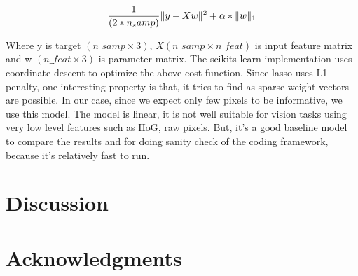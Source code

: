 \documentclass[10pt]{article}
\begin{document}
$${1 \over (2*n_samp)} \| y -Xw \|^2 + \alpha * \| w \|_1$$

Where y is target $(n\_samp \times 3)$, $X (n\_samp \times n\_feat)$ is input feature matrix and w $(n\_feat \times 3)$ is parameter matrix. The scikits-learn implementation uses coordinate descent to optimize the above cost function. Since lasso uses L1 penalty, one interesting property is that, it tries to find as sparse weight vectors are possible. In our case, since we expect only few pixels to be informative, we use this model. The model is linear, it is not well suitable for vision tasks using very low level features such as HoG, raw pixels. But, it's a good baseline model to compare the results and for doing sanity check of the coding framework, because it's relatively fast to run.

\section*{Discussion}


\section*{Acknowledgments}


\end{document}
